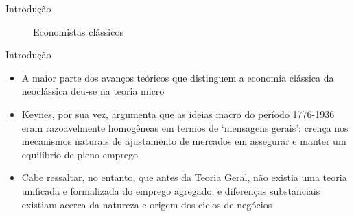 \documentclass[10pt]{beamer}
\begin{document}
\begin{frame}
    {Introdução}    
        \begin{figure}
            \centering
             \qquad
            \caption{Economistas clássicos}
            \label{fig2}
        \end{figure}    
\end{frame}

\begin{frame}{Introdução}
    \begin{itemize}
        \item A maior parte dos avanços teóricos que distinguem a economia clássica da neoclássica deu-se na teoria micro\bigskip

        \item Keynes, por sua vez, argumenta que as ideias macro do período 1776-1936 eram razoavelmente homogêneas em termos de `mensagens gerais': crença nos mecanismos naturais de ajustamento de mercados em assegurar e manter um equilíbrio de pleno emprego\bigskip

        \item Cabe ressaltar, no entanto, que antes da Teoria Geral, não existia uma teoria unificada e formalizada do emprego agregado, e diferenças substanciais existiam acerca da natureza e origem dos ciclos de negócios
    \end{itemize}
\end{frame}
\end{document}
